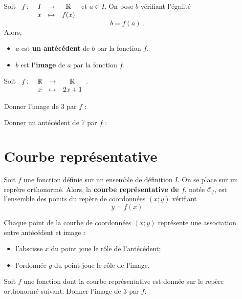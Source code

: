 \documentclass{poly}
\begin{document}
\begin{definition}
Soit $\begin{array}[t]{lccc} f \colon &I &\to& \mathbb{R}\\ & x &\mapsto& f(x)\end{array}$ et $a \in I$. On pose $b$ vérifiant l'égalité
\begin{equation*}
b = f(a)\,.
\end{equation*}
Alors, 
\begin{itemize}
\item $a$ est \textbf{un antécédent} de $b$ par la fonction $f$.
\item $b$ est \textbf{l'image} de $a$ par la fonction $f$.
\end{itemize}
\end{definition}
\begin{example}
Soit $\begin{array}[t]{lccc} f \colon &\mathbb{R} &\to& \mathbb{R}\\ & x &\mapsto& 2x+1\end{array}$.
\begin{alphaquestions}
\item Donner l'image de $3$ par $f$ : 
\item Donner un antécédent de $7$ par $f$ : 
\end{alphaquestions}
\end{example}
\newpage
\section{Courbe représentative}

\begin{definition}
Soit $f$ une fonction définie sur un ensemble de définition $I$. On se place sur un reprère orthonormé. Alors, la \textbf{courbe représentative de $f$}, notée $\mathcal{C}_f$, est l'ensemble des points du repère de coordonnées $(x;y)$ vérifiant
\begin{equation*}
y = f(x)
\end{equation*}
\end{definition}
\begin{remark}
Chaque point de la courbe de coordonnées $(x;y)$ représente une association entre antécédent et image : 
\begin{itemize}
\item l'abscisse $x$ du point joue le rôle de l'antécédent; 
\item l'ordonnée $y$ du point joue le rôle de l'image.
\end{itemize}
\end{remark}
\begin{example}
Soit $f$ une fonction dont la courbe représentative est donnée sur le repère orthonormé suivant. Donner l'image de $3$ par $f$: 
\begin{center}
\end{center}
\end{example}
\end{document}
